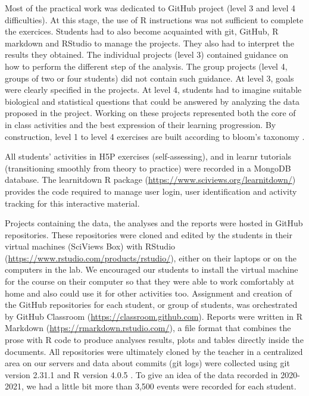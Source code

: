 \documentclass{aims}
\theoremstyle{definition}
\begin{document}
Most of the practical work was dedicated to GitHub project (level 3 and
level 4 difficulties). At this stage, the use of R instructions was not
sufficient to complete the exercices. Students had to also become
acquainted with git, GitHub, R markdown and RStudio to manage the
projects. They also had to interpret the results they obtained. The
individual projects (level 3) contained guidance on how to perform the
different step of the analysis. The group projects (level 4, groups of
two or four students) did not contain such guidance. At level 3, goals
were clearly specified in the projects. At level 4, students had to
imagine suitable biological and statistical questions that could be
answered by analyzing the data proposed in the project. Working on these
projects represented both the core of in class activities and the best
expression of their learning progression. By construction, level 1 to
level 4 exercises are built according to bloom's taxonomy
\cite{Krathwohl2002}.

All students' activities in H5P exercises (self-assessing), and in
learnr tutorials (transitioning smoothly from theory to practice) were
recorded in a MongoDB database. The learnitdown R package
(\url{https://www.sciviews.org/learnitdown/}) provides the code required
to manage user login, user identification and activity tracking for this
interactive material.

Projects containing the data, the analyses and the reports were hosted
in GitHub repositories. These repositories were cloned and edited by the
students in their virtual machines (SciViews Box) with RStudio
(\url{https://www.rstudio.com/products/rstudio/}), either on their
laptops or on the computers in the lab. We encouraged our students to
install the virtual machine for the course on their computer so that
they were able to work comfortably at home and also could use it for
other activities too. Assignment and creation of the GitHub repositories
for each student, or group of students, was orchestrated by GitHub
Classroom (\url{https://classroom.github.com}). Reports were written in
R Markdown (\url{https://rmarkdown.rstudio.com/}), a file format that
combines the prose with R code to produce analyses results, plots and
tables directly inside the documents. All repositories were ultimately
cloned by the teacher in a centralized area on our servers and data
about commits (git logs) were collected using git version 2.31.1 and R
version 4.0.5 \cite{Rcoreteam2021}. To give an idea of the data recorded
in 2020-2021, we had a little bit more than 3,500 events were recorded
for each student.
\end{document}
